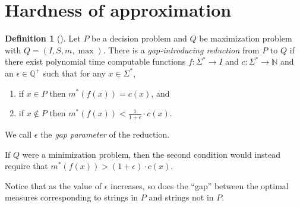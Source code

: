 \documentclass[]{article}
\theoremstyle{plain}
\theoremstyle{definition}
\newtheorem{definition}{Definition}
\begin{document}
\section{Hardness of approximation}

\begin{definition}[{\cite[Section~29.1]{vazirani}}]
  Let $P$ be a decision problem and $Q$ be maximization problem with $Q = (I, S, m, \max)$.
  There is a \emph{gap-introducing reduction} from $P$ to $Q$ if there exist polynomial time computable functions $f \colon \Sigma^* \to I$ and $c \colon \Sigma^* \to \mathbb{N}$ and an $\epsilon \in \mathbb{Q}^+$ such that for any $x \in \Sigma^*$,
  \begin{enumerate}
  \item if $x \in P$ then $m^*(f(x)) = c(x)$, and
  \item if $x \notin P$ then $m^*(f(x)) < \frac{1}{1 + \epsilon} \cdot c(x)$.
  \end{enumerate}
  We call $\epsilon$ the \emph{gap parameter} of the reduction.

  If $Q$ were a minimization problem, then the second condition would instead require that $m^*(f(x)) > (1 + \epsilon) \cdot c(x)$.
\end{definition}

Notice that as the value of $\epsilon$ increases, so does the ``gap'' between the optimal measures corresponding to strings in $P$ and strings not in $P$.
\end{document}
